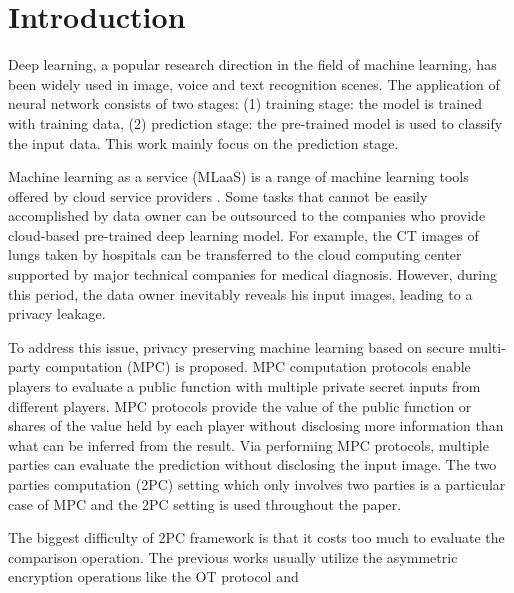 \documentclass[letterpaper]{article} %
\begin{document}
\section{Introduction}



    \noindent Deep learning, a popular research direction in the field of machine learning,
    has been widely used in image, voice and text recognition scenes.
    The application of neural network consists of two stages:
    (1) training stage: the model is trained with training data,
    (2) prediction stage: the pre-trained model is used to classify the input data.
    This work mainly focus on the prediction stage.

    Machine learning as a service (MLaaS) is a range of machine learning tools offered by cloud service providers \cite{ChironCloud}.
    Some tasks that cannot be easily accomplished by data owner can be outsourced to
    the companies who provide cloud-based pre-trained deep learning model.
    For example, the CT images of lungs taken by hospitals
    can be transferred to the cloud computing center
    supported by major technical companies for medical diagnosis.
    However, during this period, the data owner inevitably reveals his input images,
    leading to a privacy leakage.

    To address this issue, privacy preserving machine learning based on secure multi-party
    computation (MPC) is proposed.
    MPC computation protocols enable players to evaluate a public function
    with multiple private secret inputs from different players.
    MPC protocols provide the value of the public function or shares of the value held by each player
    without disclosing more information than what can be inferred from the result.
    Via performing MPC protocols,
    multiple parties can evaluate the prediction without disclosing the input image.
    The two parties computation (2PC) setting which only involves two parties is a particular case of MPC
    and the 2PC setting is used throughout the paper.

    The biggest difficulty of 2PC framework is that it costs too much to
    evaluate the comparison operation.
    The previous works usually utilize the asymmetric encryption
    operations like the  OT protocol and

\end{document}
